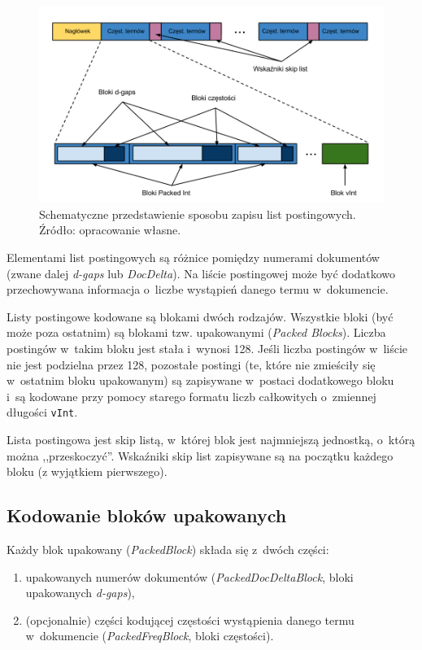 \begin{figure}[here]
 \includegraphics[scale=0.37]{pictures/PostingCodingFormat.png}
 \caption{Schematyczne przedstawienie sposobu zapisu list postingowych. Źródło: opracowanie własne. \label{fig:postingCodingFormat}}
\end{figure}

Elementami list postingowych są różnice pomiędzy numerami dokumentów (zwane dalej \emph{d-gaps} lub \emph{DocDelta}). Na liście postingowej może być dodatkowo przechowywana informacja o~liczbe wystąpień danego termu w~dokumencie.

Listy postingowe kodowane są blokami dwóch rodzajów. Wszystkie bloki (być może poza ostatnim) są blokami tzw. upakowanymi (\emph{Packed Blocks}). Liczba postingów w~takim bloku jest stała i~wynosi 128. Jeśli liczba postingów w~liście nie jest podzielna przez 128, pozostałe postingi (te, które nie zmieściły się w~ostatnim bloku upakowanym) są zapisywane w~postaci dodatkowego bloku i~są kodowane przy pomocy starego formatu liczb całkowitych o~zmiennej długości \texttt{vInt}.

Lista postingowa jest skip listą, w~której blok jest najmniejszą jednostką, o~którą można ,,przeskoczyć''. Wskaźniki skip list zapisywane są na początku każdego bloku (z wyjątkiem pierwszego).

\subsection{Kodowanie bloków upakowanych}
\label{sec:packedBlockEncoding}

Każdy blok upakowany (\emph{PackedBlock}) składa się z~dwóch części: 
\begin{enumerate}
 \item upakowanych numerów dokumentów (\emph{PackedDocDeltaBlock}, bloki upakowanych \emph{d-gaps}),
 \item (opcjonalnie) części kodującej częstości wystąpienia danego termu w~dokumencie (\emph{PackedFreqBlock}, bloki częstości).
\end{enumerate}


